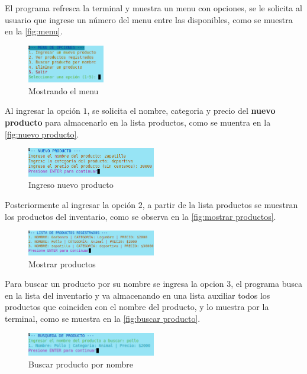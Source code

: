 \documentclass[12pt]{article}
\begin{document}
El programa refresca la terminal y muestra un menu con opciones, se le solicita al usuario que ingrese un número del menu entre las disponibles, como se muestra en la \autoref{fig:menu}.

\begin{figure}[H]
	\centering
	\setlength{\fboxrule}{0pt}
	\includegraphics[width=0.3\textwidth]{Imagenes/menu.png}
	\caption{Mostrando el menu}
	\label{fig:menu}
\end{figure} 

Al ingresar la opción $1$, se solicita el nombre, categoria y precio del \textbf{nuevo producto} para almacenarlo en la lista productos, como se muentra en la \autoref{fig:nuevo producto}.

\begin{figure}[H]
	\centering
	\setlength{\fboxrule}{0pt}
	\includegraphics[width=0.5\textwidth]{Imagenes/nuevo_producto.png}
	\caption{Ingreso nuevo producto}
	\label{fig:nuevo producto}
\end{figure} 

Posteriormente al ingresar la opción $2$, a partir de la lista productos se muestran los productos del inventario, como se observa en la \autoref{fig:mostrar productos}.

\begin{figure}[H]
	\centering
	\setlength{\fboxrule}{0pt}
	\includegraphics[width=0.5\textwidth]{Imagenes/mostrar_productos.png}
	\caption{Mostrar productos}
	\label{fig:mostrar productos}
\end{figure} 

Para buscar un producto por su nombre se ingresa la opcion $3$, el programa busca en la lista del inventario y va almacenando en una lista auxiliar todos los productos que coinciden con el nombre del producto, y lo muestra por la terminal, como se muestra en la \autoref{fig:buscar producto}.

\begin{figure}[H]
	\centering
	\setlength{\fboxrule}{0pt}
	\includegraphics[width=0.5\textwidth]{Imagenes/busqueda_por_nombre_producto.png}
	\caption{Buscar producto por nombre}
	\label{fig:buscar producto}
\end{figure} 
\end{document}
